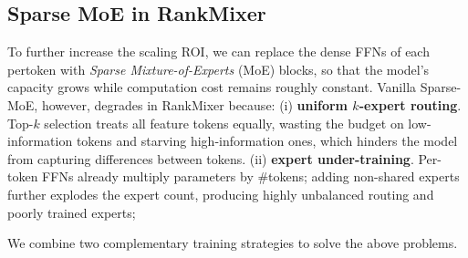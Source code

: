 

  



 \subsection{Sparse MoE in RankMixer}
To further increase the scaling ROI, we can replace the dense FFNs of each pertoken  with
\emph{Sparse Mixture-of-Experts} (MoE) blocks, so that the model's capacity grows while computation cost
remains roughly constant.
Vanilla Sparse-MoE, however, degrades in RankMixer because:
(i) \textbf{uniform $k$-expert routing}.  Top-$k$ selection treats all feature tokens
equally, wasting the budget on low-information tokens and starving high-information ones, which hinders the model from capturing differences between tokens.
(ii) \textbf{expert under-training}.  Per-token FFNs already multiply parameters by
\#tokens; adding non-shared experts further explodes the expert count, producing
highly unbalanced routing and poorly trained experts;

We combine two complementary training strategies to solve the above problems.

